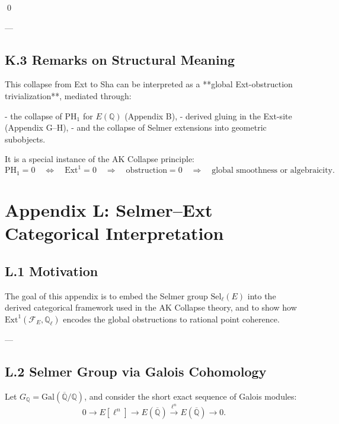 \documentclass[11pt]{article}
\theoremstyle{definition}
\begin{document}
\qed

---

\subsection*{K.3 Remarks on Structural Meaning}

This collapse from Ext to Sha can be interpreted as a **global Ext-obstruction trivialization**, mediated through:

- the collapse of PH$_1$ for \( E(\mathbb{Q}) \) (Appendix B),
- derived gluing in the Ext-site (Appendix G–H),
- and the collapse of Selmer extensions into geometric subobjects.

It is a special instance of the AK Collapse principle:  
\[
\mathrm{PH}_1 = 0 \quad \Leftrightarrow \quad \mathrm{Ext}^1 = 0 \quad \Rightarrow \quad \text{obstruction} = 0 \quad \Rightarrow \quad \text{global smoothness or algebraicity}.
\]



\section*{Appendix L: Selmer--Ext Categorical Interpretation}

\subsection*{L.1 Motivation}

The goal of this appendix is to embed the Selmer group \( \mathrm{Sel}_\ell(E) \)  
into the derived categorical framework used in the AK Collapse theory,  
and to show how \( \mathrm{Ext}^1(\mathcal{F}_E, \mathbb{Q}_\ell) \) encodes the global obstructions to rational point coherence.

---

\subsection*{L.2 Selmer Group via Galois Cohomology}

Let \( G_\mathbb{Q} = \mathrm{Gal}(\overline{\mathbb{Q}}/\mathbb{Q}) \), and consider the short exact sequence of Galois modules:
\[
0 \longrightarrow E[\ell^n] \longrightarrow E(\overline{\mathbb{Q}}) \xrightarrow{\ell^n} E(\overline{\mathbb{Q}}) \longrightarrow 0.
\]
\end{document}
